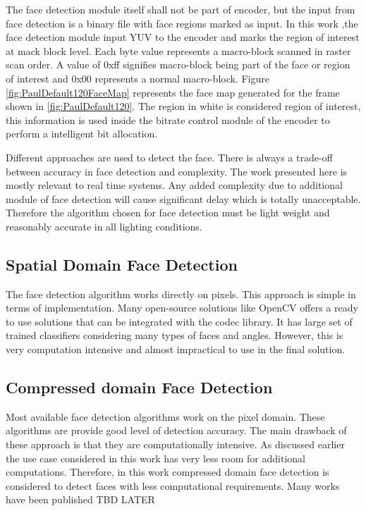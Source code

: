 \documentclass[11pt]{article} %
\begin{document}
 The face detection module itself shall not be part of encoder, but the input from face detection is a binary file with face regions marked as input. In this work ,the face detection module input YUV to the encoder and marks the region of interest at mack block level. Each byte value represents a macro-block scanned in raster scan order. A value of 0xff signifies macro-block being part of the face or region of interest and 0x00 represents a normal macro-block. Figure \ref{fig:PaulDefault120FaceMap} represents the face map generated for the frame shown in \ref{fig:PaulDefault120}. The region in white is considered region of interest, this information is used inside the bitrate control module of the encoder to perform a intelligent bit allocation.

Different approaches are used to detect the face. There is always a trade-off between accuracy in face detection and complexity. The work presented here is mostly relevant to real time systems. Any added complexity due to additional module of face detection will cause significant delay which is totally unacceptable. Therefore the algorithm chosen for face detection must be light weight and reasonably accurate in all lighting conditions. 

\subsection{Spatial Domain Face Detection}
The face detection algorithm works directly on pixels. This approach is simple in terms of implementation. Many open-source solutions like OpenCV offers a ready to use solutions that can be integrated with the codec library. It has large set of trained classifiers considering many types of faces and angles. However, this is very computation intensive and almost impractical to use in the final solution. 
\subsection{Compressed domain Face Detection}
Most available face detection algorithms work on the pixel domain. These algorithms are provide good level of detection accuracy. The main drawback of these approach is that they are computationally intensive. As discussed earlier the use case considered in this work has very less room for additional computations. Therefore, in this work compressed domain face detection is considered to detect faces with less computational requirements. 
Many works have been published
TBD LATER
%
%
% 
\end{document}
